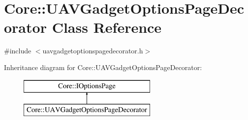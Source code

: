 \hypertarget{class_core_1_1_u_a_v_gadget_options_page_decorator}{\section{\-Core\-:\-:\-U\-A\-V\-Gadget\-Options\-Page\-Decorator \-Class \-Reference}
\label{class_core_1_1_u_a_v_gadget_options_page_decorator}
}


{\ttfamily \#include $<$uavgadgetoptionspagedecorator.\-h$>$}

\-Inheritance diagram for \-Core\-:\-:\-U\-A\-V\-Gadget\-Options\-Page\-Decorator\-:\begin{figure}[H]
\begin{center}
\leavevmode
\includegraphics[height=2.000000cm]{class_core_1_1_u_a_v_gadget_options_page_decorator}
\end{center}
\end{figure}
